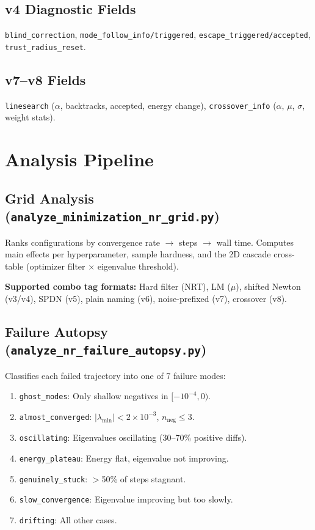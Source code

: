 \documentclass[11pt,a4paper]{article}
\newcommand{\eval}{\lambda}
\begin{document}
\subsection{v4 Diagnostic Fields}

\texttt{blind\_correction}, \texttt{mode\_follow\_info/triggered}, \texttt{escape\_triggered/accepted}, \texttt{trust\_radius\_reset}.

\subsection{v7--v8 Fields}

\texttt{linesearch} ($\alpha$, backtracks, accepted, energy change), \texttt{crossover\_info} ($\alpha$, $\mu$, $\sigma$, weight stats).

\section{Analysis Pipeline}
\label{sec:analysis-pipeline}

\subsection{Grid Analysis (\texttt{analyze\_minimization\_nr\_grid.py})}

Ranks configurations by convergence rate $\to$ steps $\to$ wall time. Computes main effects per hyperparameter, sample hardness, and the 2D cascade cross-table (optimizer filter $\times$ eigenvalue threshold).

\textbf{Supported combo tag formats:} Hard filter (NRT), LM ($\mu$), shifted Newton (v3/v4), SPDN (v5), plain naming (v6), noise-prefixed (v7), crossover (v8).

\subsection{Failure Autopsy (\texttt{analyze\_nr\_failure\_autopsy.py})}

Classifies each failed trajectory into one of 7 failure modes:
\begin{enumerate}
  \item \texttt{ghost\_modes}: Only shallow negatives in $[-10^{-4}, 0)$.
  \item \texttt{almost\_converged}: $|\eval_\text{min}| < 2\times10^{-3}$, $n_\text{neg} \leq 3$.
  \item \texttt{oscillating}: Eigenvalues oscillating (30--70\% positive diffs).
  \item \texttt{energy\_plateau}: Energy flat, eigenvalue not improving.
  \item \texttt{genuinely\_stuck}: $>$50\% of steps stagnant.
  \item \texttt{slow\_convergence}: Eigenvalue improving but too slowly.
  \item \texttt{drifting}: All other cases.
\end{enumerate}
\end{document}
